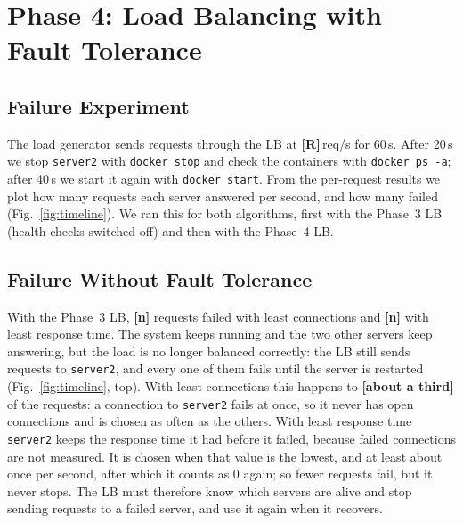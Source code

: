 \section{Phase 4: Load Balancing with Fault Tolerance}\label{sec:phase4}

\subsection{Failure Experiment}
The load generator sends requests through the LB at \textbf{[R]}\,req/s for 60\,s.
After 20\,s we stop \texttt{server2} with \texttt{docker stop} and check the containers
with \texttt{docker ps -a}; after 40\,s we start it again with \texttt{docker start}. From the per-request results we plot how many requests each
server answered per second, and how many failed (Fig.~\ref{fig:timeline}). We ran
this for both algorithms, first with the Phase~3 LB (health checks switched off)
and then with the Phase~4 LB.

\subsection{Failure Without Fault Tolerance}
With the Phase~3 LB, \textbf{[n]} requests failed with least connections and
\textbf{[n]} with least response time. The system keeps running and the two other
servers keep answering, but the load is no longer balanced correctly: the LB still
sends requests to \texttt{server2}, and every one of them fails until the server is
restarted (Fig.~\ref{fig:timeline}, top). With least connections this happens to
\textbf{[about a third]} of the requests: a connection to \texttt{server2} fails at once, so it never has
open connections and is chosen as often as the others. With least response time
\texttt{server2} keeps the response time it had before it failed, because failed
connections are not measured. It is chosen when that value is the lowest, and at least
about once per second, after which it counts as 0 again; so fewer requests fail, but it
never stops. The LB must therefore know which servers are alive and stop sending
requests to a failed server, and use it again when it recovers.

